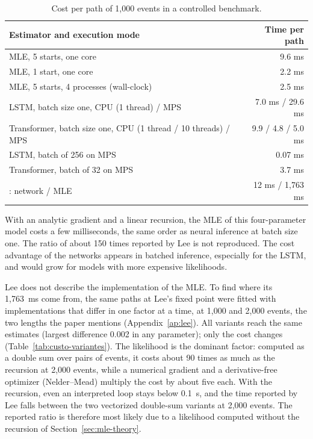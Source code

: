 \begin{table}[htbp]
\centering
\caption{Cost per path of 1,000 events in a controlled benchmark.}
\label{tab:custo}
\small
\begin{tabular}{lr}
\toprule
Estimator and execution mode & Time per path\\
\midrule
MLE, 5 starts, one core & 9.6 ms\\
MLE, 1 start, one core & 2.2 ms\\
MLE, 5 starts, 4 processes (wall-clock) & 2.5 ms\\
LSTM, batch size one, CPU (1 thread) / MPS & 7.0 ms / 29.6 ms\\
Transformer, batch size one, CPU (1 thread / 10 threads) / MPS & 9.9 / 4.8 / 5.0 ms\\
LSTM, batch of 256 on MPS & 0.07 ms\\
Transformer, batch of 32 on MPS & 3.7 ms\\
\midrule
\citet{lee2023}: network / MLE & 12 ms / 1,763 ms\\
\bottomrule
\end{tabular}
\end{table}

With an analytic gradient and a linear recursion, the MLE of this four-parameter
model costs a few milliseconds, the same order as neural inference at batch size one.
The ratio of about 150 times reported by Lee is not reproduced. The cost advantage of
the networks appears in batched inference, especially for the LSTM, and would grow
for models with more expensive likelihoods.

Lee does not describe the implementation of the MLE. To find where its 1,763~ms come from,
the same paths at Lee's fixed point were fitted with implementations that differ in one factor
at a time, at 1,000 and 2,000 events, the two lengths the paper mentions
(Appendix~\ref{ap:lee}). All variants reach the same estimates (largest difference 0.002 in any
parameter); only the cost changes (Table~\ref{tab:custo-variantes}). The likelihood is the
dominant factor: computed as a double sum over pairs of events, it costs about 90 times as much
as the recursion at 2,000 events, while a numerical gradient and a derivative-free optimizer
(Nelder--Mead) multiply the cost by about five each. With the recursion, even an interpreted
loop stays below 0.1~s, and the time reported by Lee falls between the two vectorized
double-sum variants at 2,000 events. The reported ratio is therefore most likely due to a
likelihood computed without the recursion of Section~\ref{sec:mle-theory}.


